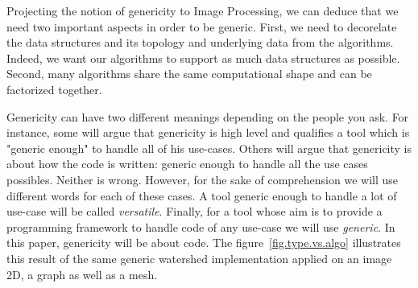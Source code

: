 Projecting the notion of genericity to Image Processing, we can deduce that we need two important aspects in order to be
generic. First, we need to decorelate the data structures and its topology and underlying data from the algorithms.
Indeed, we want our algorithms to support as much data structures as possible. Second, many algorithms share the same
computational shape and can be factorized together.


Genericity can have two different meanings depending on the people you ask. For instance, some will argue that
genericity is high level and qualifies a tool which is "generic enough" to handle all of his use-cases. Others will
argue that genericity is about how the code is written: generic enough to handle all the use cases possibles. Neither is
wrong. However, for the sake of comprehension we will use different words for each of these cases. A tool generic enough
to handle a lot of use-case will be called \emph{versatile}. Finally, for a tool whose aim is to provide a programming
framework to handle code of any use-case we will use \emph{generic}. In this paper, genericity will be about code. The
figure~\ref{fig.type.vs.algo} illustrates this result of the same generic watershed implementation applied on an image
2D, a graph as well as a mesh.

